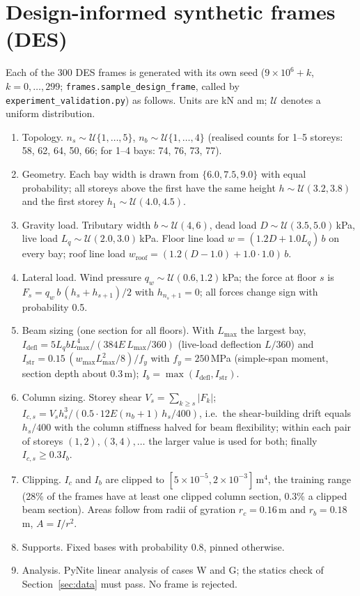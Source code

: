 \section{Design-informed synthetic frames (DES)}\label{app:des}
Each of the 300 DES frames is generated with its own seed ($9\times10^6+k$, $k=0,\dots,299$; \texttt{frames.sample\_design\_frame}, called by \texttt{experiment\_validation.py}) as follows. Units are kN and m; $\mathcal{U}$ denotes a uniform distribution.
\begin{enumerate}
\item Topology. $n_s\sim\mathcal{U}\{1,\dots,5\}$, $n_b\sim\mathcal{U}\{1,\dots,4\}$ (realised counts for 1--5 storeys: 58, 62, 64, 50, 66; for 1--4 bays: 74, 76, 73, 77).
\item Geometry. Each bay width is drawn from $\{6.0, 7.5, 9.0\}$ with equal probability; all storeys above the first have the same height $h\sim\mathcal{U}(3.2,3.8)$ and the first storey $h_1\sim\mathcal{U}(4.0,4.5)$.
\item Gravity load. Tributary width $b\sim\mathcal{U}(4,6)$, dead load $D\sim\mathcal{U}(3.5,5.0)$\,kPa, live load $L_q\sim\mathcal{U}(2.0,3.0)$\,kPa. Floor line load $w=(1.2D+1.0L_q)\,b$ on every bay; roof line load $w_\mathrm{roof}=(1.2(D-1.0)+1.0\cdot1.0)\,b$.
\item Lateral load. Wind pressure $q_w\sim\mathcal{U}(0.6,1.2)$\,kPa; the force at floor $s$ is $F_s=q_w\,b\,(h_s+h_{s+1})/2$ with $h_{n_s+1}=0$; all forces change sign with probability 0.5.
\item Beam sizing (one section for all floors). With $L_{\max}$ the largest bay, $I_\mathrm{defl}=5L_q b L_{\max}^4/(384E\,L_{\max}/360)$ (live-load deflection $L/360$) and $I_\mathrm{str}=0.15\,(w_{\max}L_{\max}^2/8)/f_y$ with $f_y=250$\,MPa (simple-span moment, section depth about 0.3\,m); $I_b=\max(I_\mathrm{defl},I_\mathrm{str})$.
\item Column sizing. Storey shear $V_s=\sum_{k\ge s}|F_k|$; $I_{c,s}=V_s h_s^3/(0.5\cdot12E(n_b+1)\,h_s/400)$, i.e.\ the shear-building drift equals $h_s/400$ with the column stiffness halved for beam flexibility; within each pair of storeys $(1,2),(3,4),\dots$ the larger value is used for both; finally $I_{c,s}\ge0.3I_b$.
\item Clipping. $I_c$ and $I_b$ are clipped to $[5\times10^{-5}, 2\times10^{-3}]$\,m$^4$, the training range (28\% of the frames have at least one clipped column section, 0.3\% a clipped beam section). Areas follow from radii of gyration $r_c=0.16$\,m and $r_b=0.18$\,m, $A=I/r^2$.
\item Supports. Fixed bases with probability 0.8, pinned otherwise.
\item Analysis. PyNite linear analysis of cases W and G; the statics check of Section~\ref{sec:data} must pass. No frame is rejected.
\end{enumerate}

